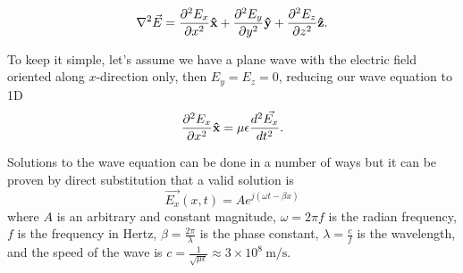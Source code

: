 \documentclass{tufte-handout}
\newcommand{\uvec}[1]{{\bm{\hat{\textnormal{\bfseries #1}}}}}
\begin{document}
\begin{equation}
\nabla^2\vec{E} = \frac{\partial^2 E_x}{\partial x^2}\uvec{x} + \frac{\partial^2 E_y}{\partial y^2}\uvec{y} + \frac{\partial^2 E_z}{\partial z^2}\uvec{z}.
\end{equation}

To keep it simple, let's assume we have a plane wave with the electric field oriented along $x$-direction only, then $E_y = E_z = 0$, reducing our wave equation to 1D 
\begin{equation}
\frac{\partial^2 E_x}{\partial x^2}\uvec{x}  = \mu\epsilon \frac{d^2\vec{E_x}}{dt^2}. \label{eq:Exdiff}
\end{equation}

Solutions to the wave equation can be done in a number of ways but it can be proven by direct substitution 
that a valid solution is 
\begin{equation}
\vec{E_x}(x,t) = Ae^{j\left(\omega{}t-\beta{}x\right)}
\end{equation}
where $A$ is an arbitrary and constant magnitude, $\omega = 2\pi{}f$ is the radian frequency, $f$ is the frequency in Hertz, $\beta=\frac{2\pi}{\lambda}$ is the phase constant, $\lambda=\frac{c}{f}$ is the wavelength, and the speed of the wave is $c=\frac{1}{\sqrt{\mu\epsilon}}\approx 3\times10^8\SI{}{\metre\per\second}$.  
\end{document}
